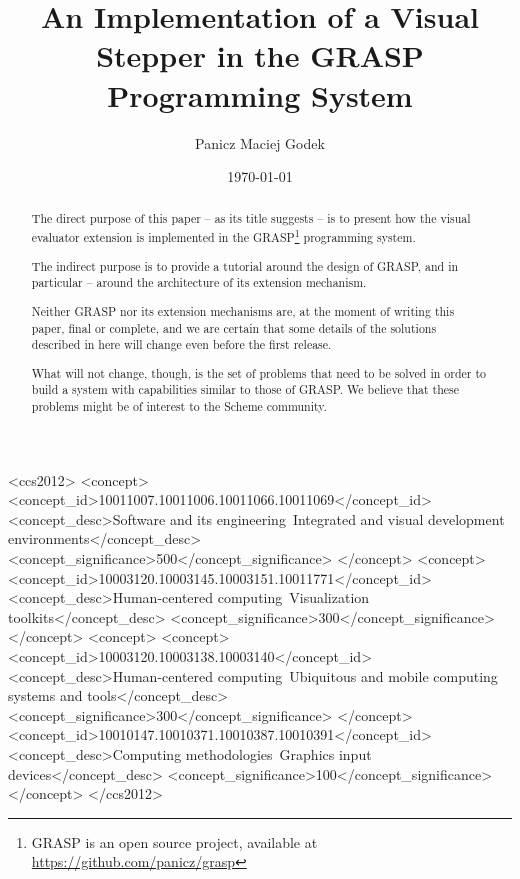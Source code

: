 \documentclass[acmsmall]{acmart}
\author{Panicz Maciej Godek}
\date{\today}
\title{An Implementation of a Visual Stepper in the GRASP Programming System}
\begin{document}

\begin{abstract}
The direct purpose of this paper -- as its title suggests -- is to
present how the visual evaluator extension is implemented in the
GRASP\footnote{GRASP is an open source project, available at
\url{https://github.com/panicz/grasp}} programming system.

The indirect purpose is to provide a tutorial around the design
of GRASP, and in particular -- around the architecture of its extension
mechanism.

Neither GRASP nor its extension mechanisms are, at the moment of
writing this paper, final or complete, and we are certain that some
details of the solutions described in here will change even before the
first release.

What will not change, though, is the set of problems that need to be
solved in order to build a system with capabilities similar to those
of GRASP. We believe that these problems might be of interest to the
Scheme community.

\end{abstract}

\begin{CCSXML}
  <ccs2012>
  <concept>
  <concept_id>10011007.10011006.10011066.10011069</concept_id>
  <concept_desc>Software and its engineering~Integrated and visual development environments</concept_desc>
  <concept_significance>500</concept_significance>
  </concept>
  <concept>
  <concept_id>10003120.10003145.10003151.10011771</concept_id>
  <concept_desc>Human-centered computing~Visualization toolkits</concept_desc>
  <concept_significance>300</concept_significance>
  </concept>
  <concept>
  <concept>
  <concept_id>10003120.10003138.10003140</concept_id>
  <concept_desc>Human-centered computing~Ubiquitous and mobile computing systems and tools</concept_desc>
  <concept_significance>300</concept_significance>
  </concept>
  <concept_id>10010147.10010371.10010387.10010391</concept_id>
  <concept_desc>Computing methodologies~Graphics input devices</concept_desc>
  <concept_significance>100</concept_significance>
  </concept>
  </ccs2012>
\end{CCSXML}

\end{document}
